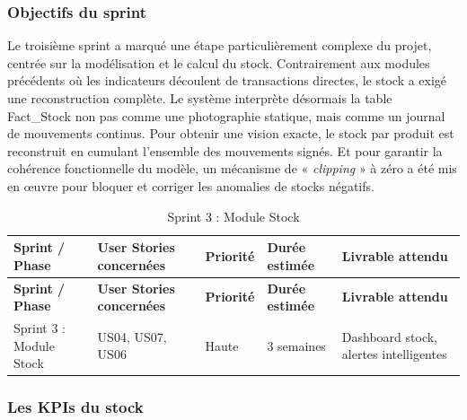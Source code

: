 \subsubsection{Objectifs du sprint}
Le troisième sprint a marqué une étape particulièrement complexe du projet, centrée sur la modélisation et le calcul du stock. Contrairement aux modules précédents où les indicateurs découlent de transactions directes, le stock a exigé une reconstruction complète. Le système interprète désormais la table Fact\_Stock non pas comme une photographie statique, mais comme un journal de mouvements continus. Pour obtenir une vision exacte, le stock par produit est reconstruit en cumulant l'ensemble des mouvements signés. Et pour garantir la cohérence fonctionnelle du modèle, un mécanisme de « \textit{clipping} » à zéro a été mis en œuvre pour bloquer et corriger les anomalies de stocks négatifs.

{\small
\renewcommand{\arraystretch}{1.2}
\setlength{\tabcolsep}{4pt}


\begin{longtable}{|p{3cm}|p{2.5cm}|p{1.6cm}|p{3cm}|p{4.5cm}|}

\caption{Sprint 3 : Module Stock} \\

\hline

\textbf{Sprint / Phase} & \textbf{User Stories concernées} & \textbf{Priorité} & \textbf{Durée estimée} & \textbf{Livrable attendu} \\
\hline
\endfirsthead

\hline
\textbf{Sprint / Phase} & \textbf{User Stories concernées} & \textbf{Priorité} & \textbf{Durée estimée} & \textbf{Livrable attendu} \\
\hline
\endhead

\hline
\endfoot

Sprint 3 : Module Stock & US04, US07, US06 & Haute & 3 semaines & Dashboard stock, alertes intelligentes \\
\hline

\end{longtable}

}
\subsubsection{Les KPIs du stock}

